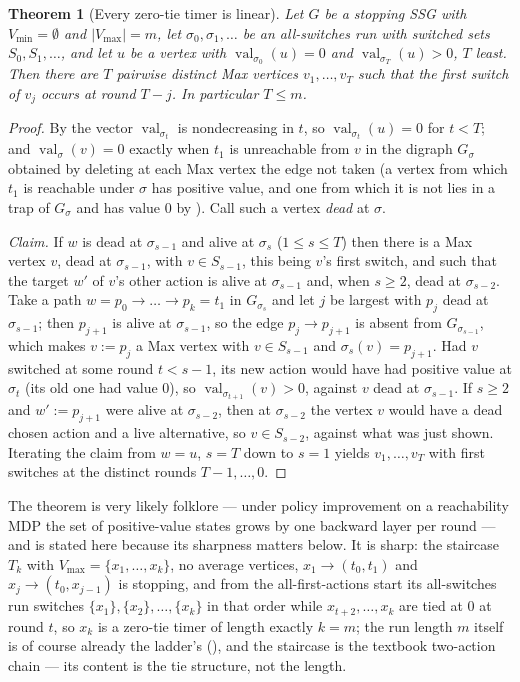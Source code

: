 \documentclass[11pt]{article}
\theoremstyle{plain}
\newtheorem{theorem}{Theorem}[section]
\theoremstyle{definition}
\DeclareMathOperator{\val}{val}
\newcommand{\Vmax}{V_{\max}}
\newcommand{\Vmin}{V_{\min}}
\begin{document}
\begin{theorem}[Every zero-tie timer is linear]\label{thm:zero-timer}
Let $G$ be a stopping SSG with $\Vmin=\emptyset$ and $|\Vmax|=m$, let
$\sigma_0,\sigma_1,\dots$ be an all-switches run with switched sets
$S_0,S_1,\dots$, and let $u$ be a vertex with $\val_{\sigma_0}(u)=0$ and
$\val_{\sigma_T}(u)>0$, $T$ least. Then there are $T$ pairwise distinct
Max vertices $v_1,\dots,v_T$ such that the \emph{first} switch of $v_j$
occurs at round $T-j$. In particular $T\le m$.
\end{theorem}

\begin{proof}
By  the vector $\val_{\sigma_t}$ is nondecreasing in
$t$, so $\val_{\sigma_t}(u)=0$ for $t<T$; and $\val_\sigma(v)=0$ exactly
when $t_1$ is unreachable from $v$ in the digraph $G_\sigma$ obtained by
deleting at each Max vertex the edge not taken (a vertex from which $t_1$
is reachable under $\sigma$ has positive value, and one from which it is
not lies in a trap of $G_\sigma$ and has value $0$ by
). Call such a vertex \emph{dead} at $\sigma$.

\emph{Claim.} If $w$ is dead at $\sigma_{s-1}$ and alive at $\sigma_s$
($1\le s\le T$) then there is a Max vertex $v$, dead at $\sigma_{s-1}$,
with $v\in S_{s-1}$, this being $v$'s first switch, and such that the
target $w'$ of $v$'s other action is alive at $\sigma_{s-1}$ and, when
$s\ge2$, dead at $\sigma_{s-2}$. Take a path $w=p_0\to\dots\to p_k=t_1$
in $G_{\sigma_s}$ and let $j$ be largest with $p_j$ dead at
$\sigma_{s-1}$; then $p_{j+1}$ is alive at $\sigma_{s-1}$, so the edge
$p_j\to p_{j+1}$ is absent from $G_{\sigma_{s-1}}$, which makes $v:=p_j$
a Max vertex with $v\in S_{s-1}$ and $\sigma_s(v)=p_{j+1}$. Had $v$
switched at some round $t<s-1$, its new action would have had positive
value at $\sigma_t$ (its old one had value $0$), so $\val_{\sigma_{t+1}}(v)>0$,
against $v$ dead at $\sigma_{s-1}$. If $s\ge2$ and $w':=p_{j+1}$ were
alive at $\sigma_{s-2}$, then at $\sigma_{s-2}$ the vertex $v$ would have
a dead chosen action and a live alternative, so $v\in S_{s-2}$, against
what was just shown. Iterating the claim from $w=u$, $s=T$ down to $s=1$
yields $v_1,\dots,v_T$ with first switches at the distinct rounds
$T-1,\dots,0$.
\end{proof}

The theorem is very likely folklore --- under policy improvement on a
reachability MDP the set of positive-value states grows by one backward
layer per round --- and is stated here because its sharpness matters
below. It is sharp: the staircase $T_k$ with $\Vmax=\{x_1,\dots,x_k\}$,
no average vertices, $x_1\to(t_0,t_1)$ and $x_j\to(t_0,x_{j-1})$ is
stopping, and from the all-first-actions start its all-switches run
switches $\{x_1\},\{x_2\},\dots,\{x_k\}$ in that order while
$x_{t+2},\dots,x_k$ are tied at $0$ at round $t$, so $x_k$ is a zero-tie
timer of length exactly $k=m$; the run length $m$ itself is of course
already the ladder's (), and the staircase is the
textbook two-action chain --- its content is the tie structure, not the
length.
\end{document}
